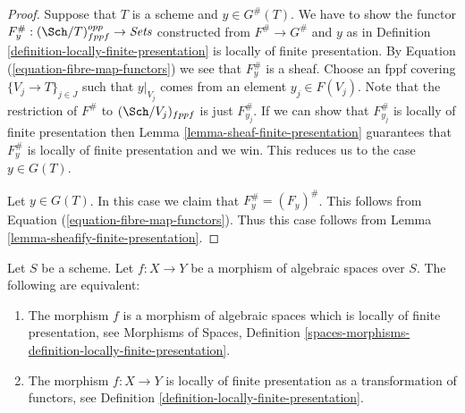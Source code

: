 \begin{proof}
Suppose that $T$ is a scheme and $y \in G^\#(T)$.
We have to show the functor
$F^\#_y : (\Sch/T)_{fppf}^{opp} \to \textit{Sets}$
constructed from $F^\# \to G^\#$ and $y$ as in
Definition \ref{definition-locally-finite-presentation}
is locally of finite presentation.
By Equation (\ref{equation-fibre-map-functors})
we see that $F^\#_y$ is a sheaf. Choose an fppf covering
$\{V_j \to T\}_{j \in J}$ such that $y|_{V_j}$ comes from
an element $y_j \in F(V_j)$.
Note that the restriction of $F^\#$ to $(\Sch/V_j)_{fppf}$
is just $F^\#_{y_j}$. If we can show that $F^\#_{y_j}$ is
locally of finite presentation then
Lemma \ref{lemma-sheaf-finite-presentation}
guarantees that $F^\#_y$ is locally of finite presentation and
we win. This reduces us to the case $y \in G(T)$.

\medskip\noindent
Let $y \in G(T)$. In this case we claim that $F^\#_y = (F_y)^\#$.
This follows from
Equation (\ref{equation-fibre-map-functors}).
Thus this case follows from
Lemma \ref{lemma-sheafify-finite-presentation}.
\end{proof}

\begin{proposition}
\label{proposition-characterize-locally-finite-presentation}
Let $S$ be a scheme. Let $f : X \to Y$ be a morphism of algebraic
spaces over $S$. The following are equivalent:
\begin{enumerate}
\item The morphism $f$ is a morphism of algebraic spaces which is
locally of finite presentation, see
Morphisms of Spaces,
Definition \ref{spaces-morphisms-definition-locally-finite-presentation}.
\item The morphism $f : X \to Y$ is locally of finite presentation as
a transformation of functors, see
Definition \ref{definition-locally-finite-presentation}.
\end{enumerate}
\end{proposition}

